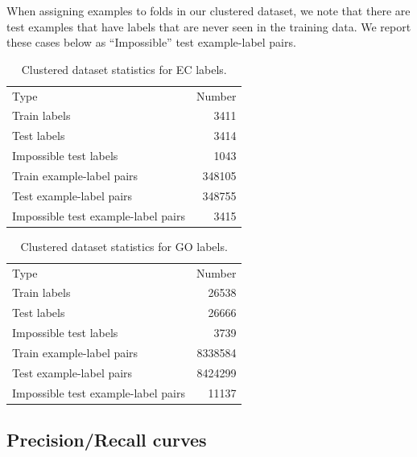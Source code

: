 When assigning examples to folds in our clustered dataset, we note that there are test examples that have labels that are never seen in the training data. We report these cases below as ``Impossible'' test example-label pairs.
\begin{table}[htbp]
\centering
\begin{tabular}{|l|r|}
\hline
                                Type &  Number \\
\Xhline{2pt}
                        Train labels &    3411 \\
\hline
                         Test labels &    3414 \\
\hline
              Impossible test labels &    1043 \\
\hline
           Train example-label pairs &  348105 \\
\hline
            Test example-label pairs &  348755 \\
\hline
 Impossible test example-label pairs &    3415 \\
\hline
\end{tabular}
\caption{Clustered dataset statistics for EC labels.}
\end{table}
\begin{table}[htbp]
\centering
\begin{tabular}{|l|r|}
\hline
                                Type &   Number \\
\Xhline{2pt}
                        Train labels &    26538 \\
\hline
                         Test labels &    26666 \\
\hline
              Impossible test labels &     3739 \\
\hline
           Train example-label pairs &  8338584 \\
\hline
            Test example-label pairs &  8424299 \\
\hline
 Impossible test example-label pairs &    11137 \\
\hline
\end{tabular}
\caption{Clustered dataset statistics for GO labels.}
\end{table}
\clearpage
\subsection{Precision/Recall curves}

